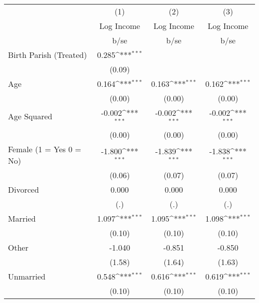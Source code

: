 {
\def\sym#1{\ifmmode^{#1}\else\(^{#1}\)\fi}
\begin{tabular}{l*{3}{c}}
\hline\hline
                    &\multicolumn{1}{c}{(1)}&\multicolumn{1}{c}{(2)}&\multicolumn{1}{c}{(3)}\\
                    &\multicolumn{1}{c}{Log Income}&\multicolumn{1}{c}{Log Income}&\multicolumn{1}{c}{Log Income}\\
                    &        b/se         &        b/se         &        b/se         \\
\hline
Birth Parish (Treated)&       0.285\sym{***}&                     &                     \\
                    &      (0.09)         &                     &                     \\
Age                 &       0.164\sym{***}&       0.163\sym{***}&       0.162\sym{***}\\
                    &      (0.00)         &      (0.00)         &      (0.00)         \\
Age Squared         &      -0.002\sym{***}&      -0.002\sym{***}&      -0.002\sym{***}\\
                    &      (0.00)         &      (0.00)         &      (0.00)         \\
Female (1 = Yes 0 = No)&      -1.800\sym{***}&      -1.839\sym{***}&      -1.838\sym{***}\\
                    &      (0.06)         &      (0.07)         &      (0.07)         \\
Divorced            &       0.000         &       0.000         &       0.000         \\
                    &         (.)         &         (.)         &         (.)         \\
Married             &       1.097\sym{***}&       1.095\sym{***}&       1.098\sym{***}\\
                    &      (0.10)         &      (0.10)         &      (0.10)         \\
Other               &      -1.040         &      -0.851         &      -0.850         \\
                    &      (1.58)         &      (1.64)         &      (1.63)         \\
Unmarried           &       0.548\sym{***}&       0.616\sym{***}&       0.619\sym{***}\\
                    &      (0.10)         &      (0.10)         &      (0.10)         \\

\end{tabular}}
